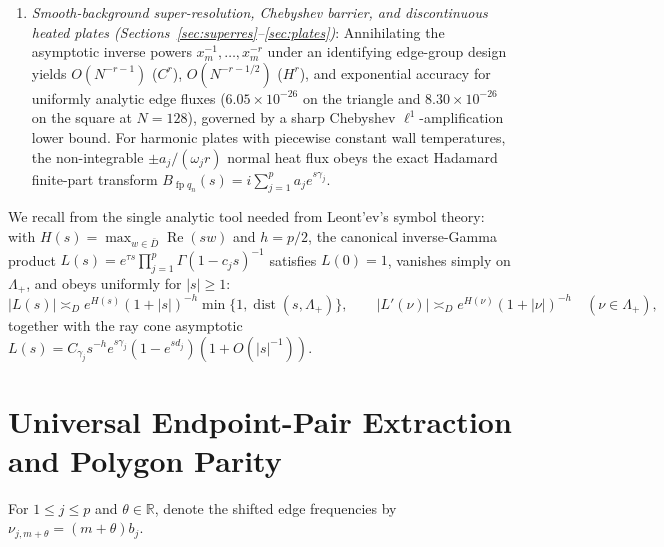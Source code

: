 \documentclass[11pt,reqno]{amsart}
\theoremstyle{definition}
\theoremstyle{remark}
\newcommand{\R}{\mathbb{R}}
\DeclareMathOperator{\dist}{dist}
\DeclareMathOperator{\fp}{fp}
\begin{document}
\begin{enumerate}
  \item \emph{Smooth-background super-resolution, Chebyshev barrier, and discontinuous heated plates (Sections~\ref{sec:superres}--\ref{sec:plates})}: Annihilating the asymptotic inverse powers $x_m^{-1},\dots,x_m^{-r}$ under an identifying edge-group design yields $O(N^{-r-1})$ ($C^r$), $O(N^{-r-1/2})$ ($H^r$), and exponential accuracy for uniformly analytic edge fluxes ($6.05\times 10^{-26}$ on the triangle and $8.30\times 10^{-26}$ on the square at $N=128$), governed by a sharp Chebyshev $\ell^1$-amplification lower bound. For harmonic plates with piecewise constant wall temperatures, the non-integrable $\pm a_j/(\omega_j r)$ normal heat flux obeys the exact Hadamard finite-part transform $B_{\fp q_n}(s) = i\sum_{j=1}^p a_j e^{s\gamma_j}$.
\end{enumerate}

We recall from \cite[Lemma~2.2]{Paper1} the single analytic tool needed from Leont'ev's symbol theory: with $H(s) = \max_{w\in\bar D}\operatorname{Re}(sw)$ and $h = p/2$, the canonical inverse-Gamma product $L(s) = e^{\tau s}\prod_{j=1}^p \Gamma(1 - c_j s)^{-1}$ satisfies $L(0)=1$, vanishes simply on $\Lambda_+$, and obeys uniformly for $|s| \ge 1$:
\begin{equation}\label{eq:L-est}
  |L(s)| \asymp_D e^{H(s)} (1 + |s|)^{-h} \min\bigl\{1, \dist(s, \Lambda_+)\bigr\},
  \qquad |L'(\nu)| \asymp_D e^{H(\nu)} (1 + |\nu|)^{-h} \quad (\nu \in \Lambda_+),
\end{equation}
together with the ray cone asymptotic $L(s) = C_{\gamma_j} s^{-h} e^{s\gamma_j}(1 - e^{s d_j})(1 + O(|s|^{-1}))$.

\section{Universal Endpoint-Pair Extraction and Polygon Parity}\label{sec:parity}

For $1 \le j \le p$ and $\theta \in \R$, denote the shifted edge frequencies by $\nu_{j,m+\theta} = (m + \theta) b_j$.
\end{document}
